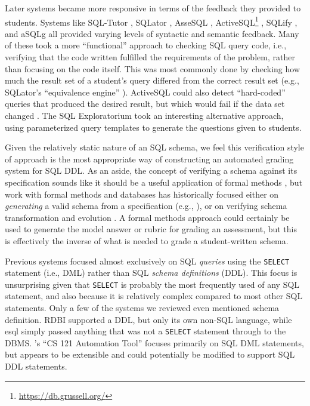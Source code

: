 \documentclass[sigconf, review, anonymous, capitalise]{acmart}
\begin{document}
Later systems became more responsive in terms of the feedback they provided to students. Systems like SQL-Tutor \cite{Mitrovic.A-1998a-Learning}, SQLator \cite{Sadiq.S-2004a-SQLator}, AsseSQL \cite{Prior.J-2004a-Backwash}, ActiveSQL\footnote{\url{https://db.grussell.org/}} \cite{Russell.G-2004a-Improving,Russell.G-2005a-Online}, SQLify \cite{Dekeyser.S-2007a-Computer}, and aSQLg \cite{Kleiner.C-2013a-Automated} all provided varying levels of syntactic and semantic feedback. Many of these took a more ``functional'' approach to checking SQL query code, i.e., verifying that the code written fulfilled the requirements of the problem, rather than focusing on the code itself. This was most commonly done by checking how much the result set of a student's query differed from the correct result set (e.g., SQLator's ``equivalence engine'' \cite{Sadiq.S-2004a-SQLator}). ActiveSQL could also detect ``hard-coded'' queries that produced the desired result, but which would fail if the data set changed \cite{Russell.G-2005a-Online}. The SQL Exploratorium \cite{Brusilovsky.P-2010a-Learning} took an interesting alternative approach, using parameterized query templates to generate the questions given to students.

Given the relatively static nature of an SQL schema, we feel this verification style of approach is the most appropriate way of constructing an automated grading system for SQL DDL. As an aside, the concept of verifying a schema against its specification sounds like it should be a useful application of formal methods \cite{Spivey.J-1989a-An-introduction}, but work with formal methods and databases has historically focused either on \emph{generating} a valid schema from a specification (e.g., \cite{Vatanawood.W-2004a-Formal,Lukovic.I-2003a-Proceedings,Choppella.V-2006a-Constructing}), or on verifying schema transformation and evolution \cite{Bench-Capon.T-1998a-Report}. A formal methods approach could certainly be used to generate the model answer or rubric for grading an assessment, but this is effectively the inverse of what is needed to grade a student-written schema.

Previous systems focused almost exclusively on SQL \emph{queries} using the \texttt{SELECT} statement (i.e., DML) rather than SQL \emph{schema definitions} (DDL). This focus is unsurprising given that \texttt{SELECT} is probably the most frequently used of any SQL statement, and also because it is relatively complex compared to most other SQL statements. Only a few of the systems we reviewed even mentioned schema definition. RDBI \cite{Dietrich.S-1993a-An-educational} supported a DDL, but only its own non-SQL language, while esql \cite{Kearns.R-1997a-A-teaching} simply passed anything that was not a \texttt{SELECT} statement through to the DBMS. \citeauthor{Gong.A-2015a-CS-121-Automation}'s ``CS 121 Automation Tool'' \cite{Gong.A-2015a-CS-121-Automation} focuses primarily on SQL DML statements, but appears to be extensible and could potentially be modified to support SQL DDL statements.
\end{document}
